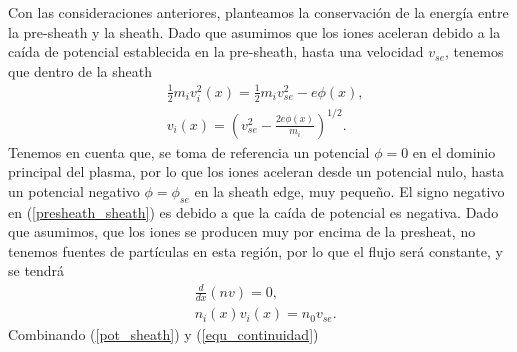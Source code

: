 \documentclass[../main.tex]{subfiles}
\begin{document}
    Con las consideraciones anteriores, planteamos la conservación de la energía entre la pre-sheath y la sheath. Dado que asumimos que los iones aceleran debido a la caída de potencial establecida en la pre-sheath, hasta una velocidad $v_{se}$, tenemos que dentro de la sheath 
    \begin{align}
        &\frac{1}{2} m_i v_i^2(x) = \frac{1}{2} m_i v_{se}^2 - e\phi(x), \label{presheath_sheath}\\
        & v_i(x) = \left(v_{se}^2 - \frac{2e\phi \left(x\right)}{m_i}\right)^{1/2}. \label{pot_sheath}
    \end{align}
    Tenemos en cuenta que, se toma de referencia un potencial $\phi=0$ en el dominio principal del plasma, por lo que los iones
    aceleran desde un potencial nulo, hasta un potencial negativo $\phi=\phi_{se}$ en la sheath edge, muy pequeño. El signo negativo en (\ref{presheath_sheath}) es
    debido a que la caída de potencial es negativa. Dado que asumimos, que los iones se producen muy por encima de la presheat, no tenemos fuentes de partículas en esta
    región, por lo que el flujo será constante, y se tendrá
    \begin{align}
        &\frac{d}{dx}\left( nv \right) = 0, \\
        &n_i(x)v_i(x) = n_0v_{se}. \label{equ_continuidad}
    \end{align}
    Combinando (\ref{pot_sheath}) y (\ref{equ_continuidad})
\end{document}
